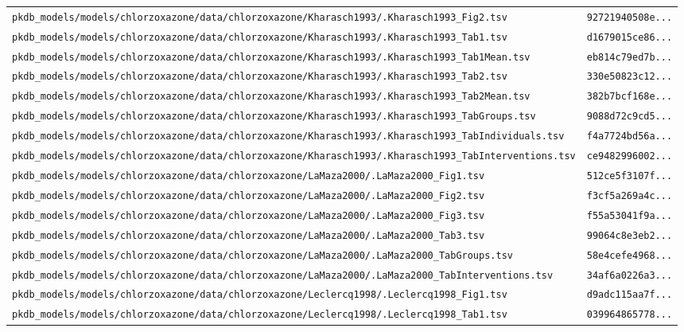 \documentclass{article}
\begin{document}
\begin{longtable}{ll}
\texttt{pkdb\_models/models/chlorzoxazone/data/chlorzoxazone/Kharasch1993/.Kharasch1993\_Fig2.tsv} & \texttt{92721940508e...} \\
\texttt{pkdb\_models/models/chlorzoxazone/data/chlorzoxazone/Kharasch1993/.Kharasch1993\_Tab1.tsv} & \texttt{d1679015ce86...} \\
\texttt{pkdb\_models/models/chlorzoxazone/data/chlorzoxazone/Kharasch1993/.Kharasch1993\_Tab1Mean.tsv} & \texttt{eb814c79ed7b...} \\
\texttt{pkdb\_models/models/chlorzoxazone/data/chlorzoxazone/Kharasch1993/.Kharasch1993\_Tab2.tsv} & \texttt{330e50823c12...} \\
\texttt{pkdb\_models/models/chlorzoxazone/data/chlorzoxazone/Kharasch1993/.Kharasch1993\_Tab2Mean.tsv} & \texttt{382b7bcf168e...} \\
\texttt{pkdb\_models/models/chlorzoxazone/data/chlorzoxazone/Kharasch1993/.Kharasch1993\_TabGroups.tsv} & \texttt{9088d72c9cd5...} \\
\texttt{pkdb\_models/models/chlorzoxazone/data/chlorzoxazone/Kharasch1993/.Kharasch1993\_TabIndividuals.tsv} & \texttt{f4a7724bd56a...} \\
\texttt{pkdb\_models/models/chlorzoxazone/data/chlorzoxazone/Kharasch1993/.Kharasch1993\_TabInterventions.tsv} & \texttt{ce9482996002...} \\
\texttt{pkdb\_models/models/chlorzoxazone/data/chlorzoxazone/LaMaza2000/.LaMaza2000\_Fig1.tsv} & \texttt{512ce5f3107f...} \\
\texttt{pkdb\_models/models/chlorzoxazone/data/chlorzoxazone/LaMaza2000/.LaMaza2000\_Fig2.tsv} & \texttt{f3cf5a269a4c...} \\
\texttt{pkdb\_models/models/chlorzoxazone/data/chlorzoxazone/LaMaza2000/.LaMaza2000\_Fig3.tsv} & \texttt{f55a53041f9a...} \\
\texttt{pkdb\_models/models/chlorzoxazone/data/chlorzoxazone/LaMaza2000/.LaMaza2000\_Tab3.tsv} & \texttt{99064c8e3eb2...} \\
\texttt{pkdb\_models/models/chlorzoxazone/data/chlorzoxazone/LaMaza2000/.LaMaza2000\_TabGroups.tsv} & \texttt{58e4cefe4968...} \\
\texttt{pkdb\_models/models/chlorzoxazone/data/chlorzoxazone/LaMaza2000/.LaMaza2000\_TabInterventions.tsv} & \texttt{34af6a0226a3...} \\
\texttt{pkdb\_models/models/chlorzoxazone/data/chlorzoxazone/Leclercq1998/.Leclercq1998\_Fig1.tsv} & \texttt{d9adc115aa7f...} \\
\texttt{pkdb\_models/models/chlorzoxazone/data/chlorzoxazone/Leclercq1998/.Leclercq1998\_Tab1.tsv} & \texttt{039964865778...} \\

\end{longtable}
\end{document}
